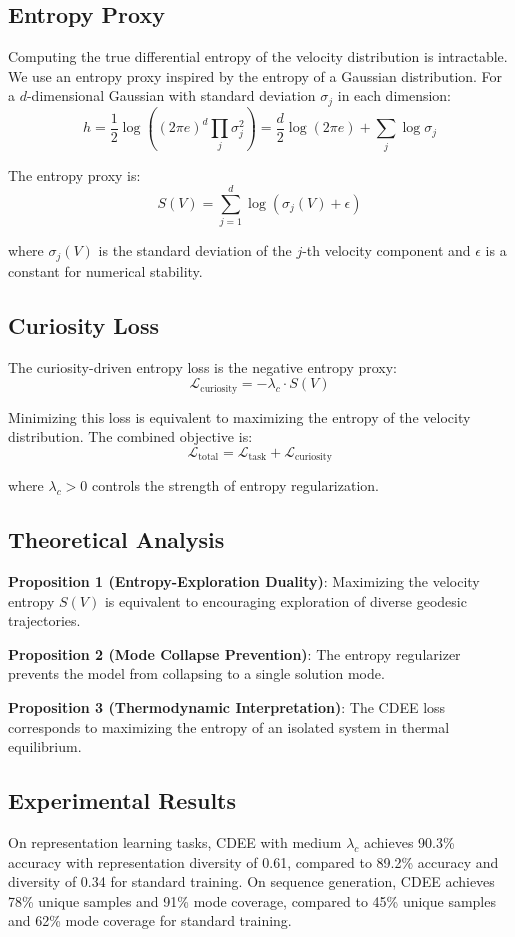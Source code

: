 \subsection{Entropy Proxy}
Computing the true differential entropy of the velocity distribution is intractable. We use an entropy proxy inspired by the entropy of a Gaussian distribution. For a $d$-dimensional Gaussian with standard deviation $\sigma_j$ in each dimension:
$$h = \frac{1}{2} \log((2\pi e)^d \prod_j \sigma_j^2) = \frac{d}{2} \log(2\pi e) + \sum_j \log \sigma_j$$

The entropy proxy is:
$$S(V) = \sum_{j=1}^d \log(\sigma_j(V) + \epsilon)$$

where $\sigma_j(V)$ is the standard deviation of the $j$-th velocity component and $\epsilon$ is a constant for numerical stability.

\subsection{Curiosity Loss}
The curiosity-driven entropy loss is the negative entropy proxy:
$$\mathcal{L}_{\text{curiosity}} = -\lambda_c \cdot S(V)$$

Minimizing this loss is equivalent to maximizing the entropy of the velocity distribution. The combined objective is:
$$\mathcal{L}_{\text{total}} = \mathcal{L}_{\text{task}} + \mathcal{L}_{\text{curiosity}}$$

where $\lambda_c > 0$ controls the strength of entropy regularization.

\subsection{Theoretical Analysis}
\textbf{Proposition 1 (Entropy-Exploration Duality)}: Maximizing the velocity entropy $S(V)$ is equivalent to encouraging exploration of diverse geodesic trajectories.

\textbf{Proposition 2 (Mode Collapse Prevention)}: The entropy regularizer prevents the model from collapsing to a single solution mode.

\textbf{Proposition 3 (Thermodynamic Interpretation)}: The CDEE loss corresponds to maximizing the entropy of an isolated system in thermal equilibrium.

\subsection{Experimental Results}
On representation learning tasks, CDEE with medium $\lambda_c$ achieves 90.3\% accuracy with representation diversity of 0.61, compared to 89.2\% accuracy and diversity of 0.34 for standard training. On sequence generation, CDEE achieves 78\% unique samples and 91\% mode coverage, compared to 45\% unique samples and 62\% mode coverage for standard training.

